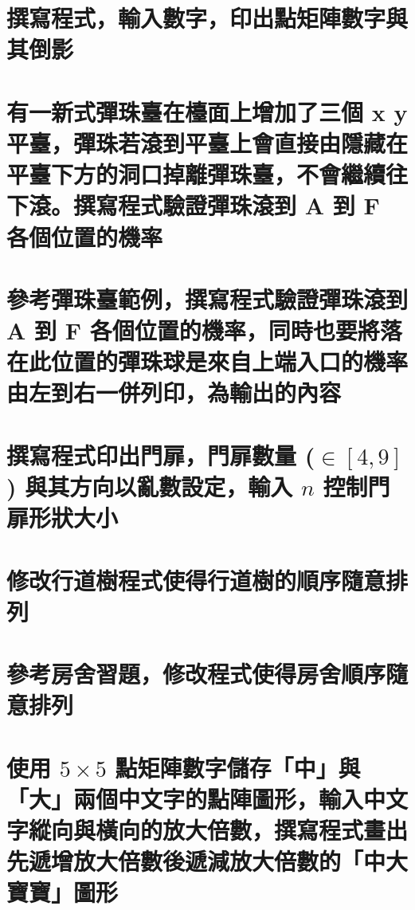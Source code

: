 \section{撰寫程式，輸入數字，印出點矩陣數字與其倒影}


\section{有一新式彈珠臺在檯面上增加了三個 x y 平臺，彈珠若滾到平臺上會直接由隱藏在平臺下方的洞口掉離彈珠臺，不會繼續往下滾。撰寫程式驗證彈珠滾到 A 到 F 各個位置的機率}


\section{參考彈珠臺範例，撰寫程式驗證彈珠滾到 A 到 F 各個位置的機率，同時也要將落在此位置的彈珠球是來自上端入口的機率由左到右一併列印，為輸出的內容}


\section{撰寫程式印出門扉，門扉數量 ($\in[4,9]$) 與其方向以亂數設定，輸入 $n$ 控制門扉形狀大小}


\section{修改行道樹程式使得行道樹的順序隨意排列}


\section{參考房舍習題，修改程式使得房舍順序隨意排列}


\section{使用 $5\times 5$ 點矩陣數字儲存「中」與「大」兩個中文字的點陣圖形，輸入中文字縱向與橫向的放大倍數，撰寫程式畫出先遞增放大倍數後遞減放大倍數的「中大寶寶」圖形}

